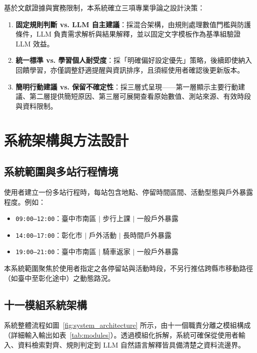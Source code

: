 \documentclass[conference]{IEEEtran}
\begin{document}
基於文獻證據與實務限制，本系統確立三項專業爭論之設計決策：
\begin{enumerate}
  \item \textbf{固定規則判斷 vs. LLM 自主建議}：採混合架構，由規則處理數值門檻與防護條件，LLM 負責需求解析與結果解釋，並以固定文字模板作為基準組驗證 LLM 效益。
  \item \textbf{統一標準 vs. 學習個人耐受度}：採「明確偏好設定優先」策略，後續即使納入回饋學習，亦僅調整舒適提醒與資訊排序，且須經使用者確認後更新版本。
  \item \textbf{簡明行動建議 vs. 保留不確定性}：採三層式呈現——第一層顯示主要行動建議、第二層提供簡短原因、第三層可展開查看原始數值、測站來源、有效時段與資料限制。
\end{enumerate}

\section{系統架構與方法設計}

\subsection{系統範圍與多站行程情境}
使用者建立一份多站行程時，每站包含地點、停留時間區間、活動型態與戶外暴露程度。例如：
\begin{itemize}
  \item \texttt{09:00--12:00}：臺中市南區 $\mid$ 步行上課 $\mid$ 一般戶外暴露
  \item \texttt{14:00--17:00}：彰化市 $\mid$ 戶外活動 $\mid$ 長時間戶外暴露
  \item \texttt{19:00--21:00}：臺中市南區 $\mid$ 騎車返家 $\mid$ 一般戶外暴露
\end{itemize}
本系統範圍聚焦於使用者指定之各停留站與活動時段，不另行推估跨縣市移動路徑（如臺中至彰化途中）之動態路況。

\subsection{十一模組系統架構}
系統整體流程如圖~\ref{fig:system_architecture} 所示，由十一個職責分離之模組構成（詳細輸入輸出如表~\ref{tab:modules}）。透過模組化拆解，系統可確保從使用者輸入、資料檢索對齊、規則判定到 LLM 自然語言解釋皆具備清楚之資料流邊界。
\end{document}
